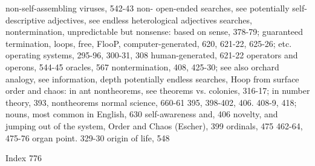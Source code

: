 non-self-assembling viruses, 542-43 non-          open-ended searches, see potentially
self-descriptive         adjectives,       see    endless
heterological adjectives                          searches, nontermination, unpredictable but
nonsense: based on sense, 378-79;                 guaranteed termination, loops, free, FlooP,
computer-generated, 620, 621-22, 625-26;          etc. operating systems, 295-96, 300-31, 308
human-generated, 621-22                           operators and operons, 544-45 oracles, 567
nontermination, 408, 425-30; see also             orchard analogy, see information, depth
potentially endless searches, Hoop                from surface order and chaos: in ant
nontheorems,        see      theorems       vs.   colonies, 316-17; in number theory, 393,
nontheorems normal science, 660-61                395, 398-402, 406. 408-9, 418;
nouns, most common in English, 630                self-awareness and, 406
novelty, and jumping out of the system,           Order and Chaos (Escher), 399 ordinals,
475                                               462-64, 475-76 organ point. 329-30 origin
                                                  of life, 548



Index                                                                                    776

